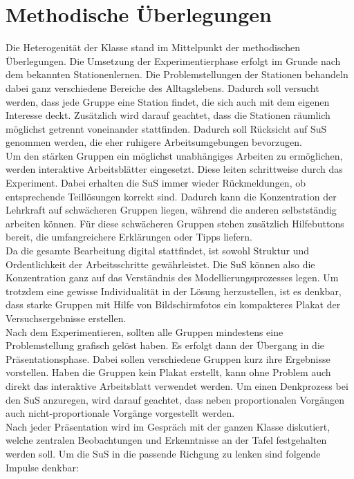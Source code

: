 \documentclass[../main.tex]{subfiles}
\begin{document}
\section{Methodische Überlegungen}
Die Heterogenität der Klasse stand im Mittelpunkt der methodischen Überlegungen. Die Umsetzung der Experimentierphase erfolgt im Grunde nach dem bekannten Stationenlernen. Die Problemstellungen der Stationen behandeln dabei ganz verschiedene Bereiche des Alltagslebens. Dadurch soll versucht werden, dass jede Gruppe eine Station findet, die sich auch mit dem eigenen Interesse deckt. Zusätzlich wird darauf geachtet, dass die Stationen räumlich möglichst getrennt voneinander stattfinden. Dadurch soll Rücksicht auf SuS genommen werden, die eher ruhigere Arbeitsumgebungen bevorzugen.\\
Um den stärken Gruppen ein möglichst unabhängiges Arbeiten zu ermöglichen, werden interaktive Arbeitsblätter eingesetzt. Diese leiten schrittweise durch das Experiment. Dabei erhalten die SuS immer wieder Rückmeldungen, ob entsprechende Teillösungen korrekt sind. Dadurch kann die Konzentration der Lehrkraft auf schwächeren Gruppen liegen, während die anderen selbstständig arbeiten können. Für diese schwächeren Gruppen stehen zusätzlich Hilfebuttons bereit, die umfangreichere Erklärungen oder Tipps liefern.\\
Da die gesamte Bearbeitung digital stattfindet, ist sowohl Struktur und Ordentlichkeit der Arbeitsschritte gewährleistet. Die SuS können also die Konzentration ganz auf das Verständnis des Modellierungsprozesses legen. Um trotzdem eine gewisse Individualität in der Lösung herzustellen, ist es denkbar, dass starke Gruppen mit Hilfe von Bildschirmfotos ein kompakteres Plakat der Versuchsergebnisse erstellen.\\
Nach dem Experimentieren, sollten alle Gruppen mindestens eine Problemstellung grafisch gelöst haben. Es erfolgt dann der Übergang in die Präsentationsphase. Dabei sollen verschiedene Gruppen kurz ihre Ergebnisse vorstellen. Haben die Gruppen kein Plakat erstellt, kann ohne Problem auch direkt das interaktive Arbeitsblatt verwendet werden. Um einen Denkprozess bei den SuS anzuregen, wird darauf geachtet, dass neben proportionalen Vorgängen auch nicht-proportionale Vorgänge vorgestellt werden.\\
Nach jeder Präsentation wird im Gespräch mit der ganzen Klasse diskutiert, welche zentralen Beobachtungen und Erkenntnisse an der Tafel festgehalten werden soll. Um die SuS in die passende Richgung zu lenken sind folgende Impulse denkbar:
\end{document}
